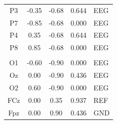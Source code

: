 \begin{table}[htbp]
\begin{tabular}{@{}cc c c l@{}}
P3   & -0.35 & -0.68 & 0.644 & EEG \\
P7   & -0.85 & -0.68 & 0.000 & EEG \\
P4   & 0.35 & -0.68 & 0.644 & EEG \\
P8   & 0.85 & -0.68 & 0.000 & EEG \\
\addlinespace
\multicolumn{5}{@{}l}{\textit{Occipital}} \\
O1   & -0.60 & -0.90 & 0.000 & EEG \\
Oz   & 0.00 & -0.90 & 0.436 & EEG \\
O2   & 0.60 & -0.90 & 0.000 & EEG \\
\addlinespace
FCz  & 0.00 & 0.35 & 0.937 & REF \\
Fpz  & 0.00 & 0.90 & 0.436 & GND \\
\bottomrule
\end{tabular}
\end{table}
